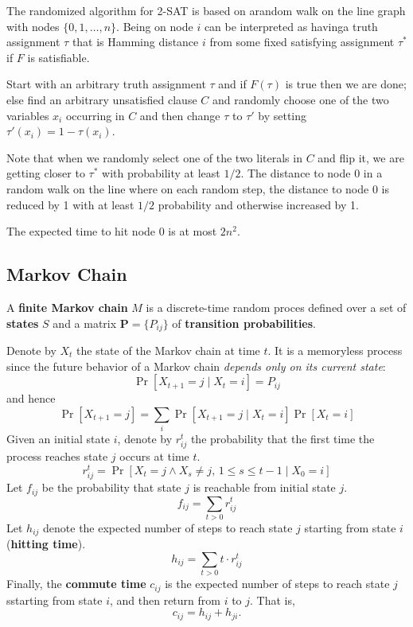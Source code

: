 The randomized algorithm for 2-SAT is based on arandom walk on the line graph with nodes $\{0,1,\ldots,n\}$. Being on node $i$ can be interpreted as havinga truth assignment $\tau$ that is Hamming distance $i$ from some fixed satisfying assignment $\tau^*$ if $F$ is satisfiable.

Start with an arbitrary truth assignment $\tau$ and if $F(\tau)$ is true then we are done; else find an arbitrary unsatisfied clause $C$ and randomly choose one of the two variables $x_i$ occurring in $C$ and then change $\tau$ to $\tau'$ by setting $\tau'(x_i) = 1 - \tau(x_i)$.

Note that when we randomly select one of the two literals in $C$ and flip it, we are getting closer to $\tau^*$ with probability at least $1/2$. The distance to node 0 in a random walk on the line where on each random step, the distance to node 0 is reduced by 1 with at least $1/2$ probability and otherwise increased by 1.

\begin{theorem}
    The expected time to hit node 0 is at most $2n^2$.
\end{theorem}

\subsection{Markov Chain}

A \textbf{finite Markov chain} $M$ is a discrete-time random proces defined over a set of \textbf{states} $S$ and a matrix $\mathbf{P} = \{P_{ij}\}$ of \textbf{transition probabilities}.

Denote by $X_t$ the state of the Markov chain at time $t$. It is a memoryless process since the future behavior of a Markov chain \textit{depends only on its current state}:
$$
\Pr[X_{t+1} = j \mid X_t = i] = P_{ij}
$$
and hence
$$
\Pr[X_{t+1} = j] = \sum_{i} \Pr[X_{t+1} = j \mid X_t = i] \Pr[X_t = i]
$$
Given an initial state $i$, denote by $r_{ij}^t$ the probability that the first time the process reaches state $j$ occurs at time $t$.
$$
r_{ij}^t = \Pr[X_t = j \land X_s \neq j,\, 1 \leq s \leq t-1 \mid X_0 = i]
$$
Let $f_{ij}$ be the probability that state $j$ is reachable from initial state $j$.
$$
f_{ij} = \sum_{t > 0} r_{ij}^t
$$
Let $h_{ij}$ denote the expected number of steps to reach state $j$ starting from state $i$ (\textbf{hitting time}).
$$
h_{ij} = \sum_{t > 0} t \cdot r_{ij}^t
$$
Finally, the \textbf{commute time} $c_{ij}$ is the expected number of steps to reach state $j$ sstarting from state $i$, and then return from $i$ to $j$. That is,
$$
c_{ij} = h_{ij} + h_{ji}.
$$

